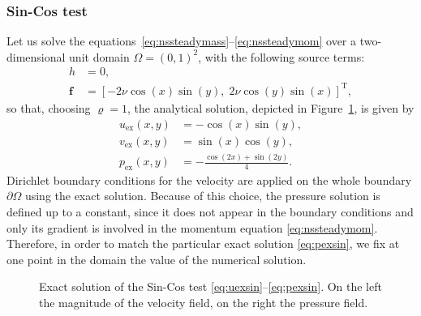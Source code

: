 \subsubsection{Sin-Cos test}
Let us solve the equations~\eqref{eq:nssteadymass}--\eqref{eq:nssteadymom} over 
a two-dimensional unit domain $\Omega=(0,1)^2$, with the following source terms:
\begin{align}
	h &= 0,\\
	\mathbf{f} &= [-2\nu \cos(x) \sin(y), \; 2\nu \cos(y) \sin(x)]^\mathrm{T},
\end{align}
so that, choosing $\varrho=1$, the analytical solution, depicted in 
Figure~\ref{fig:sincosexact}, is given by
\begin{align}
\label{eq:uexsin}	u_\text{ex}(x,y) &= -\cos(x)\sin(y),\\
	v_\text{ex}(x,y) &= \sin(x)\cos(y),\\
\label{eq:pexsin}	p_\text{ex}(x,y) &= -\frac{\cos(2x)+\sin(2y)}{4}.
\end{align}
Dirichlet boundary conditions for the velocity are applied on the whole 
boundary $\partial \Omega$ using the exact solution. Because of this choice, 
the pressure solution is defined up to a constant, since it does not appear in 
the boundary conditions and only its gradient is involved in the momentum 
equation \eqref{eq:nssteadymom}. Therefore, in order to match the particular 
exact solution \eqref{eq:pexsin}, we fix at one point in the domain the value 
of the numerical solution.
\begin{figure}
	\centering
	\caption[Exact solution of the Sin-Cos test]{Exact solution of the Sin-Cos 
	test \eqref{eq:uexsin}--\eqref{eq:pexsin}. On the left the magnitude of the 
	velocity field, on the right the 
	pressure field.}
	\label{fig:sincosexact}
\end{figure}

